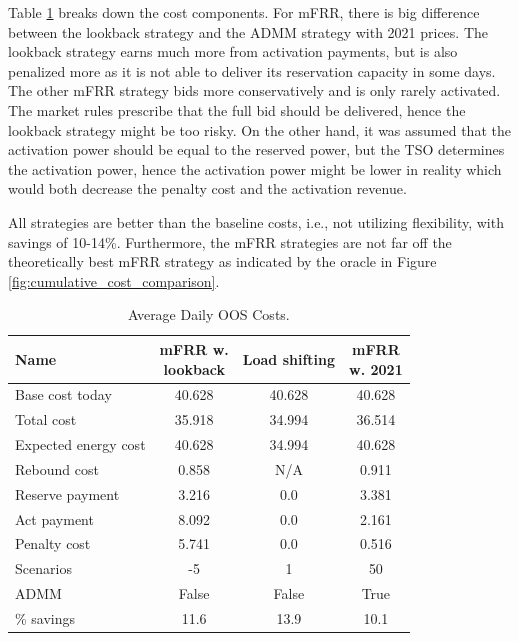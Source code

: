 Table \ref{tab:cases_compared} breaks down the cost components. For mFRR, there is big difference between the lookback strategy and the ADMM strategy with 2021 prices. The lookback strategy earns much more from activation payments, but is also penalized more as it is not able to deliver its reservation capacity in some days. The other mFRR strategy bids more conservatively and is only rarely activated. The market rules prescribe that the full bid should be delivered, hence the lookback strategy might be too risky. On the other hand, it was assumed that the activation power should be equal to the reserved power, but the TSO determines the activation power, hence the activation power might be lower in reality which would both decrease the penalty cost and the activation revenue.

All strategies are better than the baseline costs, i.e., not utilizing flexibility, with savings of 10-14\%. Furthermore, the mFRR strategies are not far off the theoretically best mFRR strategy as indicated by the oracle in Figure \ref{fig:cumulative_cost_comparison}.

\begin{flushleft}
    \begin{table}[!t]
        \caption{Average Daily OOS Costs.}
        \label{tab:cases_compared}
        \centering
        \begin{tabular}{lccc}
            \toprule
            Name                 & \thead{mFRR w.                   \\lookback} & Load shifting & \thead{mFRR \\w. 2021} \\
            \midrule
            Base cost today      & 40.628         & 40.628 & 40.628 \\
            Total cost           & 35.918         & 34.994 & 36.514 \\
            Expected energy cost & 40.628         & 34.994 & 40.628 \\
            Rebound cost         & 0.858          & N/A    & 0.911  \\
            Reserve payment      & 3.216          & 0.0    & 3.381  \\
            Act payment          & 8.092          & 0.0    & 2.161  \\
            Penalty cost         & 5.741          & 0.0    & 0.516  \\
            Scenarios            & -5             & 1      & 50     \\
            ADMM                 & False          & False  & True   \\
            \% savings           & 11.6           & 13.9   & 10.1   \\
            \bottomrule
        \end{tabular}
    \end{table}
\end{flushleft}

